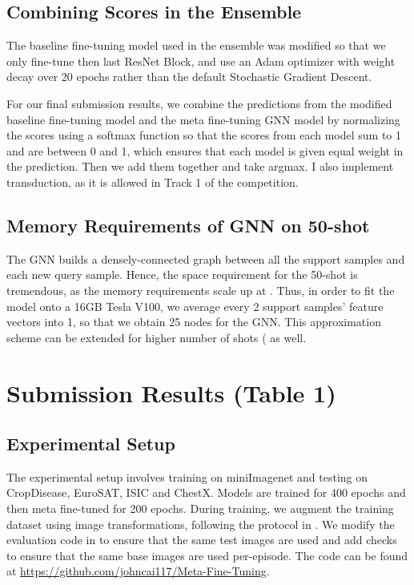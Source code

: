 \documentclass[10pt,twocolumn,letterpaper]{article}
\begin{document}
\subsection{Combining Scores in the Ensemble}
The baseline fine-tuning model used in the ensemble was modified so that we only fine-tune then last ResNet Block, and use an Adam optimizer with weight decay over 20 epochs rather than the default Stochastic Gradient Descent. 

For our final submission results, we combine the predictions from the modified baseline fine-tuning model and the meta fine-tuning GNN model by normalizing the scores using a softmax function so that the scores from each model sum to 1 and are between 0 and 1, which ensures that each model is given equal weight in the prediction.  Then we add them together and take argmax. I also implement transduction, as it is allowed in Track 1 of the competition.

\subsection{Memory Requirements of GNN on 50-shot}
The GNN builds a densely-connected graph between all the support samples and each new query sample. Hence, the space requirement for the 50-shot is tremendous, as the memory requirements scale up at . Thus, in order to fit the model onto a 16GB Tesla V100, we average every 2 support samples' feature vectors into 1, so that we obtain 25 nodes for the GNN. This approximation scheme can be extended for higher number of shots ( as well.


\section{Submission Results (Table 1)}

\subsection{Experimental Setup}
The experimental setup involves training on miniImagenet and testing on CropDisease, EuroSAT, ISIC and ChestX. Models are trained for 400 epochs and then meta fine-tuned for 200 epochs. During training, we augment the training dataset using image transformations, following the protocol in \cite{chen2019closer}. We modify the evaluation code in \cite{guo2019new} to ensure that the same test images are used and add checks to ensure that the same base images are used per-episode. The code can be found at \url{https://github.com/johncai117/Meta-Fine-Tuning}. 
\end{document}
